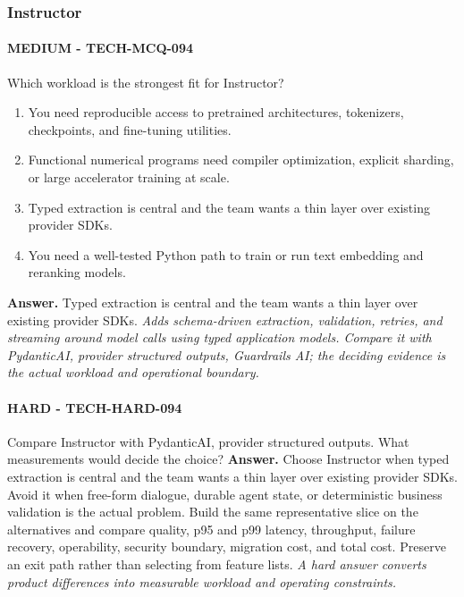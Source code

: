 \subsubsection*{Instructor}
\paragraph{MEDIUM - TECH-MCQ-094} Which workload is the strongest fit for Instructor?
\begin{enumerate}[label=\Alph*.]
\item You need reproducible access to pretrained architectures, tokenizers, checkpoints, and fine-tuning utilities.
\item Functional numerical programs need compiler optimization, explicit sharding, or large accelerator training at scale.
\item Typed extraction is central and the team wants a thin layer over existing provider SDKs.
\item You need a well-tested Python path to train or run text embedding and reranking models.
\end{enumerate}
\textbf{Answer.} Typed extraction is central and the team wants a thin layer over existing provider SDKs.
\textit{Adds schema-driven extraction, validation, retries, and streaming around model calls using typed application models. Compare it with PydanticAI, provider structured outputs, Guardrails AI; the deciding evidence is the actual workload and operational boundary.}
\paragraph{HARD - TECH-HARD-094} Compare Instructor with PydanticAI, provider structured outputs. What measurements would decide the choice?
\textbf{Answer.} Choose Instructor when typed extraction is central and the team wants a thin layer over existing provider SDKs. Avoid it when free-form dialogue, durable agent state, or deterministic business validation is the actual problem. Build the same representative slice on the alternatives and compare quality, p95 and p99 latency, throughput, failure recovery, operability, security boundary, migration cost, and total cost. Preserve an exit path rather than selecting from feature lists.
\textit{A hard answer converts product differences into measurable workload and operating constraints.}
